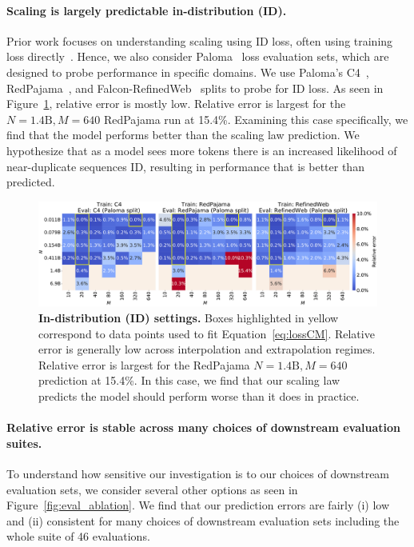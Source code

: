 \begin{appendix}
\paragraph{Scaling is largely predictable in-distribution (ID).}
Prior work focuses on understanding scaling using ID loss, often using training loss directly~\cite{kaplan2020scaling,chinchilla}.
Hence, we also consider Paloma~\cite{paloma} loss evaluation sets, which are designed to probe performance in specific domains.
We use Paloma's C4~\cite{c4,c4_ai2}, RedPajama~\cite{rpj}, and Falcon-RefinedWeb~\cite{refinedweb} splits to probe for ID loss.
As seen in Figure~\ref{fig:error_id}, relative error is mostly low.
Relative error is largest for the $N=1.4\text{B}, M=640$ RedPajama run at 15.4\%.
Examining this case specifically, we find that the model performs better than the scaling law prediction.
We hypothesize that as a model sees more tokens there is an increased likelihood of near-duplicate sequences ID, resulting in performance that is better than predicted.

\begin{figure}[tp]
    \centering
    \includegraphics[width=\linewidth]{figs/error_id.pdf}
    \caption{\textbf{In-distribution (ID) settings.} Boxes highlighted in yellow correspond to data points used to fit Equation~\eqref{eq:lossCM}. Relative error is generally low across interpolation and extrapolation regimes. Relative error is largest for the RedPajama $N=1.4\text{B}, M=640$ prediction at 15.4\%. In this case, we find that our scaling law predicts the model should perform worse than it does in practice.
    }
    \label{fig:error_id}
\end{figure}

\paragraph{Relative error is stable across many choices of downstream evaluation suites.}

To understand how sensitive our investigation is to our choices of downstream evaluation sets, we consider several other options as seen in Figure~\ref{fig:eval_ablation}.
We find that our prediction errors are fairly (i) low and (ii) consistent for many choices of downstream evaluation sets including the whole suite of 46 evaluations.


\end{appendix}
